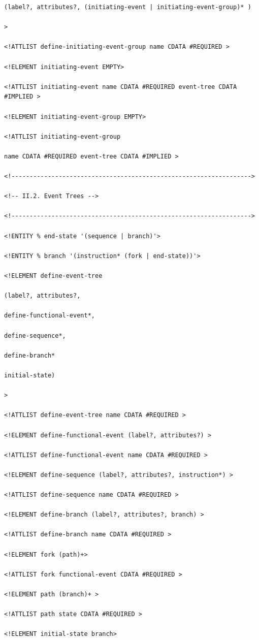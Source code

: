 \documentclass[11pt]{article}
\begin{document}
\begin{lstlisting}
(label?, attributes?, (initiating-event | initiating-event-group)* )

>

<!ATTLIST define-initiating-event-group name CDATA #REQUIRED >

<!ELEMENT initiating-event EMPTY>

<!ATTLIST initiating-event name CDATA #REQUIRED event-tree CDATA
#IMPLIED >

<!ELEMENT initiating-event-group EMPTY>

<!ATTLIST initiating-event-group

name CDATA #REQUIRED event-tree CDATA #IMPLIED >

<!------------------------------------------------------------------>

<!-- II.2. Event Trees -->

<!------------------------------------------------------------------>

<!ENTITY % end-state '(sequence | branch)'>

<!ENTITY % branch '(instruction* (fork | end-state))'>

<!ELEMENT define-event-tree

(label?, attributes?,

define-functional-event*,

define-sequence*,

define-branch*

initial-state)

>

<!ATTLIST define-event-tree name CDATA #REQUIRED >

<!ELEMENT define-functional-event (label?, attributes?) >

<!ATTLIST define-functional-event name CDATA #REQUIRED >

<!ELEMENT define-sequence (label?, attributes?, instruction*) >

<!ATTLIST define-sequence name CDATA #REQUIRED >

<!ELEMENT define-branch (label?, attributes?, branch) >

<!ATTLIST define-branch name CDATA #REQUIRED >

<!ELEMENT fork (path)+>

<!ATTLIST fork functional-event CDATA #REQUIRED >

<!ELEMENT path (branch)+ >

<!ATTLIST path state CDATA #REQUIRED >

<!ELEMENT initial-state branch>


\end{lstlisting}
\end{document}
